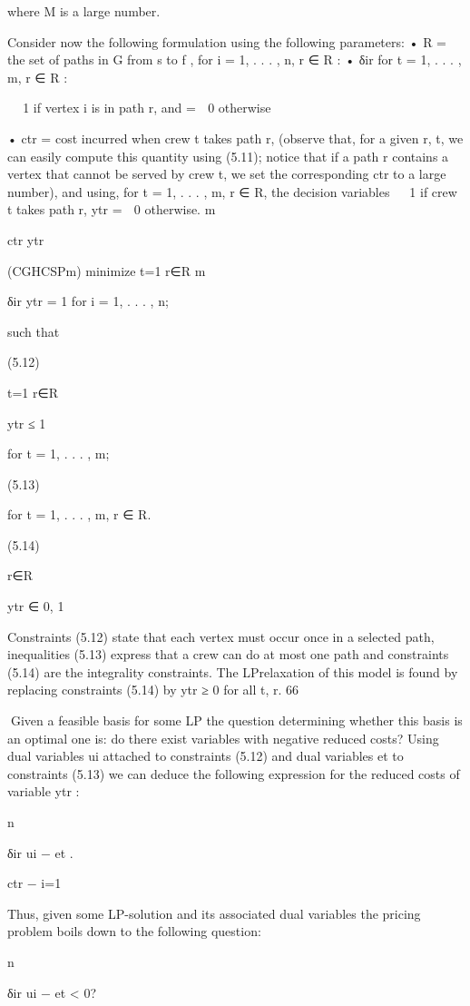 where M is a large number.

Consider now the following formulation using the following parameters:
• R = the set of paths in G from s to f ,
for i = 1, . . . , n, r ∈ R :
• δir
for t = 1, . . . , m, r ∈ R :


 1 if vertex i is in path r, and
=
 0 otherwise

• ctr = cost incurred when crew t takes path r, (observe that, for a given r, t, we can easily compute
this quantity using (5.11); notice that if a path r contains a vertex that cannot be served by crew t, we
set the corresponding ctr to a large number),
and using, for t = 1, . . . , m, r ∈ R, the decision variables

 1 if crew t takes path r,
ytr =
 0 otherwise.
m

ctr ytr

(CGHCSPm) minimize
t=1 r∈R
m

δir ytr = 1 for i = 1, . . . , n;

such that

(5.12)

t=1 r∈R

ytr ≤ 1

for t = 1, . . . , m;

(5.13)

for t = 1, . . . , m, r ∈ R.

(5.14)

r∈R

ytr ∈ {0, 1}

Constraints (5.12) state that each vertex must occur once in a selected path, inequalities (5.13) express
that a crew can do at most one path and constraints (5.14) are the integrality constraints. The LPrelaxation of this model is found by replacing constraints (5.14) by ytr ≥ 0 for all t, r.
66

Given a feasible basis for some LP the question determining whether this basis is an optimal one is: do
there exist variables with negative reduced costs? Using dual variables ui attached to constraints (5.12)
and dual variables et to constraints (5.13) we can deduce the following expression for the reduced costs
of variable ytr :

n

δir ui − et .

ctr −
i=1

Thus, given some LP-solution and its associated dual variables the pricing problem boils down to the
following question:

n

δir ui − et < 0?

